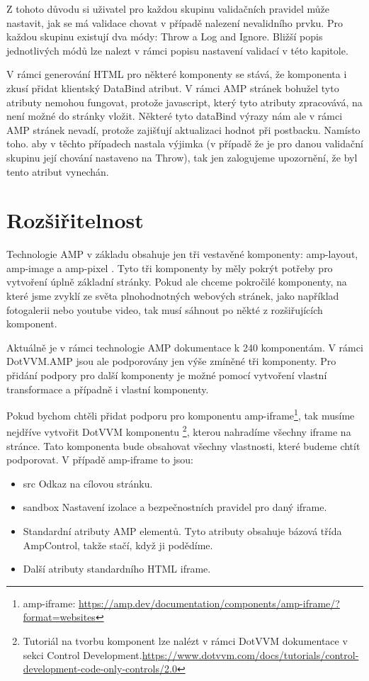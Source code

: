 Z tohoto důvodu si uživatel pro každou skupinu validačních pravidel může nastavit, jak se má validace chovat v případě nalezení nevalidního prvku. Pro každou skupinu existují dva módy: Throw a Log and Ignore. Bližší popis jednotlivých módů lze nalezt v rámci popisu nastavení validací v této kapitole.

V rámci generování HTML pro některé komponenty se stává, že komponenta i zkusí přidat klientský DataBind atribut. V rámci AMP stránek bohužel tyto atributy nemohou fungovat, protože javascript, který tyto atributy zpracovává, na není možné do stránky vložit. Některé tyto dataBind výrazy nám ale v rámci AMP stránek nevadí, protože zajišťují aktualizaci hodnot při postbacku. Namísto toho. aby v těchto případech nastala výjimka (v případě že je pro danou validační skupinu její chování nastaveno na Throw), tak jen zalogujeme upozornění, že byl tento atribut vynechán.

\section{Rozšiřitelnost}
Technologie AMP v základu obsahuje jen tři vestavěné komponenty: amp-layout, amp-image a amp-pixel \cite[Ch.\ 3, p.\ 160]{VzhuruDoAMP}. Tyto tři komponenty by měly pokrýt potřeby pro vytvoření úplně základní stránky. Pokud ale chceme pokročilé komponenty, na které jsme zvyklí ze světa plnohodnotných webových stránek, jako například fotogalerii nebo youtube video, tak musí sáhnout po někté z rozšiřujících komponent.

Aktuálně je v rámci technologie AMP dokumentace k 240 komponentám. V rámci DotVVM.AMP jsou ale podporovány jen výše zmíněné tři komponenty. Pro přidání podpory pro další komponenty je možné pomocí vytvoření vlastní transformace a případně i vlastní komponenty.

Pokud bychom chtěli přidat podporu pro komponentu amp-iframe\footnote{amp-iframe: \url{https://amp.dev/documentation/components/amp-iframe/?format=websites}}, tak musíme nejdříve vytvořit DotVVM komponentu \footnote{Tutoriál na tvorbu komponent lze nalézt v rámci DotVVM dokumentace v sekci Control Development.\newline \url{https://www.dotvvm.com/docs/tutorials/control-development-code-only-controls/2.0}}, kterou nahradíme všechny iframe na stránce. Tato komponenta bude obsahovat všechny vlastnosti, které budeme chtít podporovat. V případě amp-iframe to jsou:
\begin{itemize}
    \item src\newline
    Odkaz na cílovou stránku.
    \item sandbox\newline
    Nastavení izolace a bezpečnostních pravidel pro daný iframe.
    \item Standardní atributy AMP elementů.\newline
    Tyto atributy obsahuje bázová třída AmpControl, takže stačí, když ji podědíme.
    \item Další atributy standardního HTML iframe.
\end{itemize}

